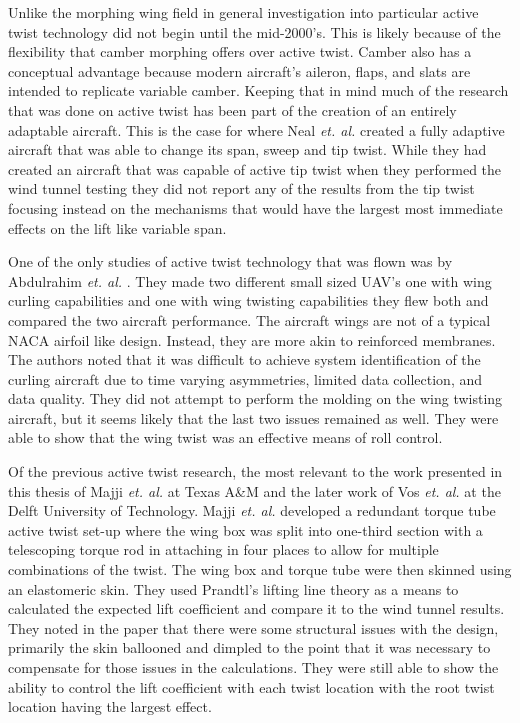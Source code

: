 \documentclass[11pt]{ucthesis}
\begin{document}
Unlike the morphing wing field in general investigation into particular active twist technology did not begin until the mid-2000's. This is likely because of the flexibility that camber morphing offers over active twist. Camber also has a conceptual advantage because modern aircraft's aileron, flaps, and slats are intended to replicate variable camber. Keeping that in mind much of the research that was done on active twist has been part of the creation of an entirely adaptable aircraft. This is the case for \cite{neal2004design} where Neal \textit{et. al.} created a fully adaptive aircraft that was able to change its span, sweep and tip twist. While they had created an aircraft that was capable of active tip twist when they performed the wind tunnel testing they did not report any of the results from the tip twist focusing instead on the mechanisms that would have the largest most immediate effects on the lift like variable span.

One of the only studies of active twist technology that was flown was by Abdulrahim \textit{et. al.} \cite{abdulrahim2004flight}. They made two different small sized UAV's one with wing curling capabilities and one with wing twisting capabilities they flew both and compared the two aircraft performance. The aircraft wings are not of a typical NACA airfoil like design. Instead, they are more akin to reinforced membranes. The authors noted that it was difficult to achieve system identification of the curling aircraft due to time varying asymmetries, limited data collection, and data quality. They did not attempt to perform the molding on the wing twisting aircraft, but it seems likely that the last two issues remained as well. They were able to show that the wing twist was an effective means of roll control.

Of the previous active twist research, the most relevant to the work presented in this thesis of Majji \textit{et. al.}\cite{majji2007design} at Texas A\&M and the later work of Vos \textit{et. al.}\cite{vos2010mechanism} at the Delft University of Technology. Majji \textit{et. al.} developed a redundant torque tube active twist set-up where the wing box was split into one-third section with a telescoping torque rod in attaching in four places to allow for multiple combinations of the twist. The wing box and torque tube were then skinned using an elastomeric skin. They used Prandtl's lifting line theory as a means to calculated the expected lift coefficient and compare it to the wind tunnel results. They noted in the paper that there were some structural issues with the design, primarily the skin ballooned and dimpled to the point that it was necessary to compensate for those issues in the calculations. They were still able to show the ability to control the lift coefficient with each twist location with the root twist location having the largest effect.
\end{document}
